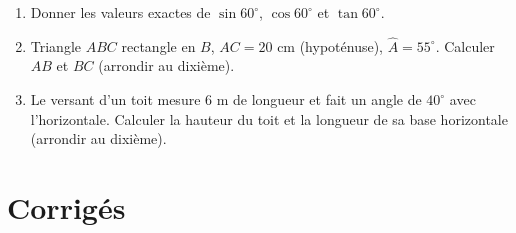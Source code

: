 \begin{enumerate}[label=\arabic*)]
\item Donner les valeurs exactes de $\sin60^{\circ}$, $\cos60^{\circ}$ et $\tan60^{\circ}$.
\item Triangle $ABC$ rectangle en $B$, $AC=20$ cm (hypoténuse), $\widehat A=55^{\circ}$.
Calculer $AB$ et $BC$ (arrondir au dixième).
\item Le versant d'un toit mesure $6$ m de longueur et fait un angle de $40^{\circ}$ avec
l'horizontale. Calculer la hauteur du toit et la longueur de sa base horizontale (arrondir
au dixième).
\end{enumerate}

\section{Corrigés}
